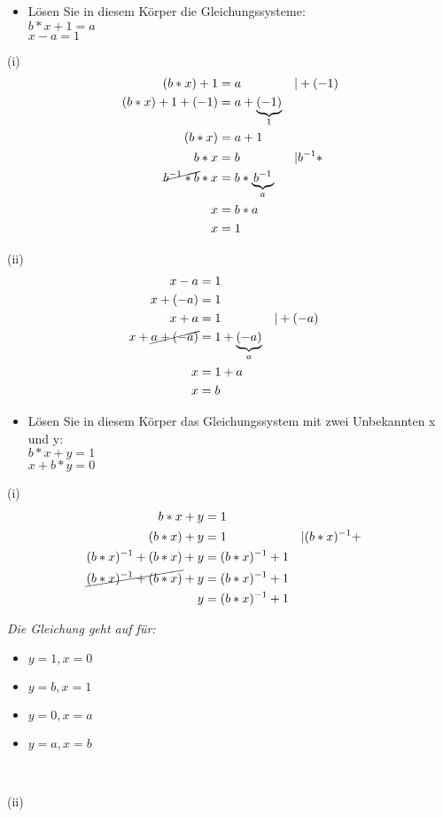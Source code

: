 \newpage

\begin{itemize}[leftmargin=*, label={b)}]
\item Lösen Sie in diesem Körper die Gleichungssysteme:\\
$b \ast x + 1 = a$\\
$x - a = 1$
\end{itemize}

(i)
\begin{align*}
(b \ast x) + 1 &= a &&| + (-1)\\
(b \ast x) + 1 + (-1) &= a + \underbrace{(-1)}_{1}\\
(b \ast x) &= a + 1\\
b \ast x &= b &&| b^{-1} \ast\\
\cancel{b^{-1} \ast b} \ast x &= b \ast \underbrace{b^{-1}}_{a}\\
x &= b \ast a\\
x &= 1
\end{align*}

(ii)
\begin{align*}
x - a &= 1\\
x + (-a) &= 1\\
x + a &= 1 &&| + (-a)\\
x + \cancel{a + (-a)} &= 1 + \underbrace{(-a)}_{a}\\
x &= 1 + a\\
x &= b
\end{align*}

\newpage

\begin{itemize}[leftmargin=*, label={c)}]
\item Lösen Sie in diesem Körper das Gleichungssystem mit zwei Unbekannten x und y:\\
$b \ast x + y = 1$\\
$x + b \ast y = 0$
\end{itemize}

(i)
\begin{align*}
b \ast x + y &= 1\\
(b \ast x) + y &= 1 &&| (b * x)^{-1} +\\
(b * x)^{-1} + (b \ast x) + y &= (b * x)^{-1} + 1\\
\cancel{(b * x)^{-1} + (b \ast x)} + y &= (b * x)^{-1} + 1\\
y &= (b * x)^{-1} + 1
\end{align*}

\textit{Die Gleichung geht auf für:}
\begin{itemize}[leftmargin=*]
\item $y = 1, x = 0$
\item $y = b, x = 1$
\item $y = 0, x = a$
\item $y = a, x = b$
\end{itemize}\

(ii)

\newpage